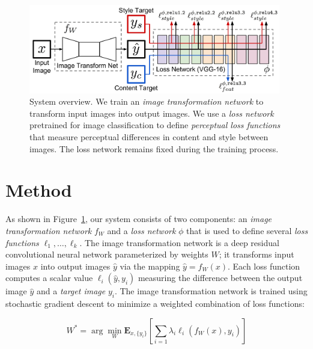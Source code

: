 \documentclass[runningheads]{llncs}
\newcommand{\Ex}[2]{\mathbf{E}_{#1}\left[#2\right]}
\begin{document}


\begin{figure}[t]
  \centering
  \includegraphics[width=0.98\textwidth]{SystemFigure.pdf}
  \vspace{-3mm}
  \caption{System overview. We train an \emph{image transformation network} to transform
    input images into output images. We use a \emph{loss network} pretrained for image
    classification to define \emph{perceptual loss functions} that measure perceptual
    differences in content and style between images. The loss network remains fixed
    during the training process.
  }
  \vspace{-3mm}
  \label{fig:system}
\end{figure}

\section{Method}
\label{sec:method}
As shown in Figure~\ref{fig:system}, our system consists of two components:
an \emph{image transformation network} $f_W$ and a \emph{loss network} $\phi$ that
is used to define several \emph{loss functions} $\ell_1,\ldots,\ell_k$. The image
transformation network is a deep residual convolutional neural network parameterized by
weights $W$; it transforms input images $x$ into output images $\hat y$ via the
mapping $\hat y = f_W(x)$. Each loss function computes a scalar value $\ell_i(\hat y, y_i)$
measuring the difference between the output image $\hat y$ and a \emph{target image} $y_i$.
The image transformation network is trained using stochastic gradient descent to minimize
a weighted combination of loss functions:

\begin{equation}
  W^* = \arg\min_W \Ex{x, \{y_i\}}{\sum_{i=1} \lambda_i \ell_i(f_W(x), y_i)}
\end{equation}
\end{document}
